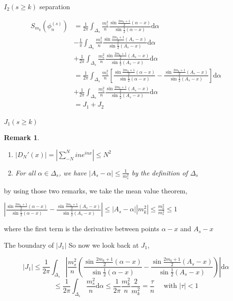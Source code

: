 \documentclass{beamer}
\newtheorem{remark}{Remark}
\begin{document}
\begin{frame}{$ I_2(s \geqslant k) $ separation}
    \begin{block}{}
    \begin{align*}
        S_{m_k}(\phi_n^{(s)})&=\frac{1}{2\pi}\int_{\Delta_s}\frac{m_s^2}{n}\frac{\sin\frac{2m_k+1}{2}(\alpha-x)}{\sin\frac{1}{2}(\alpha-x)}\mathrm{d}\alpha \\
        &- \frac{1}{\pi}\int_{\Delta_s}\frac{m_s^2}{n}\frac{\sin\frac{2m_k+1}{2}(A_s-x)}{\sin\frac{1}{2}(A_s-x)}\mathrm{d}\alpha\\
        &+\frac{1}{2\pi}\int_{\Delta_s}\frac{m_s^2}{n}\frac{\sin\frac{2m_k+1}{2}(A_s-x)}{\sin\frac{1}{2}(A_s-x)}\mathrm{d}\alpha\\ 
        &= \frac{1}{2\pi}\int_{\Delta_s}\frac{m_s^2}{n}\left[\frac{\sin\frac{2m_k+1}{2}(\alpha-x)}{\sin\frac{1}{2}(\alpha-x)}   - \frac{\sin\frac{2m_k+1}{2}(A_s-x)}{\sin\frac{1}{2}(A_s-x)} \right]\mathrm{d}\alpha \\
        &+\frac{1}{2\pi}\int_{\Delta_s}\frac{m_s^2}{n}\frac{\sin\frac{2m_k+1}{2}(A_s-x)}{\sin\frac{1}{2}(A_s-x)}\mathrm{d}\alpha\\
        &=J_1+J_2
    \end{align*}
\end{block}
\end{frame}


\begin{frame}{$ J_1(s \geqslant k) $}
    \begin{remark}
        \begin{enumerate}
            \item  $|D_N'(x)|=|\sum\limits_{-N}^{N}ine^{inx}| \leqslant N^2$
        \item For all $ \alpha \in \Delta_s $, we have $ |A_s-\alpha|\leqslant \frac{1}{m_s^2} $ by the definition of $ \Delta_s $
    \end{enumerate}
    \end{remark}
    by using those two remarks, we take the mean value theorem,
    \begin{block}{}
        $ | \frac{\sin\frac{2m_k+1}{2}(\alpha-x)}{\sin\frac{1}{2}(\alpha-x)}   - \frac{\sin\frac{2m_k+1}{2}(A_s-x)}{\sin\frac{1}{2}(A_s-x)}| \leqslant |A_s-\alpha||m_k^2| \leqslant \frac{m_k^2}{m_s^2}\leqslant 1 $
    \end{block}
    where the first term is the derivative between points $ \alpha -x  $ and $ A_s-x $
\end{frame}
\begin{frame}{The boundary of $|J_1| $}
    So now we look back at $ J_1 $,

\[ |J_1|\leqslant \frac{1}{2\pi}\int_{\Delta_s}|\frac{m_s^2}{n}\left(\frac{\sin\frac{2m_k+1}{2}(\alpha-x)}{\sin\frac{1}{2}(\alpha-x)}   - \frac{\sin\frac{2m_k+1}{2}(A_s-x)}{\sin\frac{1}{2}(A_s-x)} \right)| \mathrm{d}\alpha \]
\[ \leqslant \frac{1}{2\pi}\int_{\Delta_s}\frac{m_s^2}{n}\mathrm{d}\alpha \leqslant \frac{1}{2\pi}\frac{m_k^2}{n}\frac{2}{m_k^2}=\frac{\tau}{n}  \quad \text{ with } |\tau|<1\] 
\end{frame}
\end{document}
